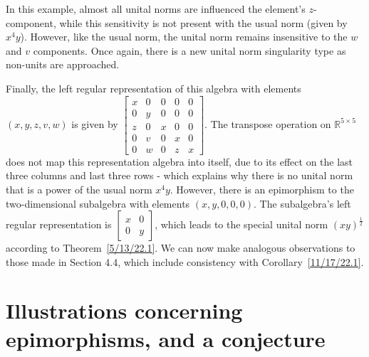 \documentclass{amsart}
\numberwithin{equation}{section}
\theoremstyle{definition}
\numberwithin{theorem}{section}
\begin{document}
In this example, almost all unital norms are influenced the element's $z$-component, while this sensitivity is not present with the usual norm (given by $x^4y$).  However, like the usual norm,  the unital norm remains insensitive to the $w$ and $v$ components.  Once again, there is a new unital norm singularity type as non-units are approached.  

Finally, the left regular representation of this algebra with elements $(x,y,z,v,w)$ is given by $ \left[
\begin{array}{ccccc}
x & 0 & 0 & 0 & 0   \\
0 & y & 0 & 0 & 0 \\
z & 0 &  x & 0 & 0  \\
0 & v &  0 & x & 0  \\
0 & w &  0 & z & x
\end{array}
\right].$ 
The transpose operation on $\mathbb{R}^{5\times 5}$ does not map this representation algebra into itself, due to its effect on the last three columns and last three rows - which explains why there is no unital norm that is a power of the usual norm $x^4y$.  However, there is an epimorphism to the two-dimensional subalgebra with elements $(x,y,0,0,0)$.  The subalgebra's left regular representation is $\left[\begin{array}{ccc}
x & 0  \\
 0 & y  
\end{array} \right]$, which leads to the special unital norm $(xy)^\frac{1}{2}$ according to \mbox{Theorem \ref{5/13/22.1}}.  We can now make analogous observations to those made in Section 4.4, which include consistency with \mbox{Corollary \ref{11/17/22.1}}.
 
 
 
\section{Illustrations concerning epimorphisms, and a conjecture}
\end{document}
